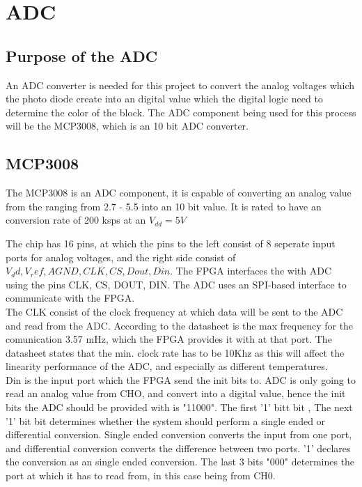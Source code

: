 \section{ADC}
\subsection{Purpose of the ADC}
An ADC converter is needed for this project to convert the analog voltages which the photo diode create into an digital value which the digital logic need to determine the color of the block.   
The ADC component being used for this process will be the MCP3008, which is an 10 bit ADC converter.  
\subsection{MCP3008}
The MCP3008 is an ADC component, it is capable of converting an analog value from the ranging from 2.7 - 5.5 into an 10 bit value. It is rated to have an conversion rate of 200 ksps at an $V_{dd} = 5V$


The chip has 16 pins, at which the pins to the left consist of 8 seperate input ports for analog voltages, and the right side consist of $V_dd, V_ref, AGND,CLK, CS, Dout, Din$.  The FPGA interfaces the with ADC using the pins CLK, CS, DOUT, DIN. 
The ADC uses an SPI-based interface to communicate with the FPGA. \\


The CLK consist of the clock frequency at which data will be sent to the ADC and read from the ADC. According to the datasheet is the max frequency for the comunication 3.57 mHz, which the FPGA provides it with at that port. The datasheet states that the min. clock rate has to be 10Khz as this will affect the linearity performance of the ADC,  and especially as different temperatures. \\


Din is the input port which the FPGA send the init bits to. 
ADC is only going to read an analog value from CHO, and convert into a digital value, hence the init bits the ADC should be provided with is "11000".  The first '1' bitt bit ,  The next '1' bit bit determines whether the system should perform a single ended or differential conversion. Single ended conversion converts the input from one port, and differential conversion converts the difference between two ports. '1' declares the conversion as an single ended conversion. The last 3 bits "000" determines the port at which it has to read from, in this case being from CH0.\\
  

